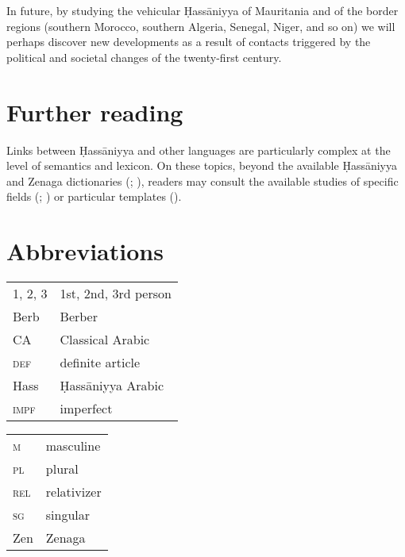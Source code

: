 \documentclass[output=paper]{langsci/langscibook}
\begin{document}
In future, by studying the vehicular Ḥassāniyya of Mauritania and of the border regions (southern Morocco, southern Algeria, Senegal, Niger, and so on) we will perhaps discover new developments as a result of contacts triggered by the political and societal changes of the twenty-first century. 

\section*{Further reading}

Links between Ḥassāniyya and other languages are particularly complex at the level of semantics and lexicon. On these topics, beyond the available Ḥassāniyya and Zenaga dictionaries (\citealt{Heath2004}; \citealt{Taine-Cheikh1988dictionary,Taine-Cheikh2008dictionary}), readers may consult the available studies of specific fields (\citealt{Monteil1952}; \citealt{Taine-Cheikh2013}) or particular templates (\citealt{Taine-Cheikh2018quadri}).

\section*{Abbreviations}
\begin{tabularx}{.5\textwidth}{@{}lQ@{}}
\textsc{1, 2, 3} & 1st, 2nd, 3rd person \\
Berb            & Berber \\
CA           & Classical Arabic \\
\textsc{def}     & definite article \\
Hass           & Ḥassāniyya Arabic \\
\textsc{impf}   & imperfect \\
\end{tabularx}%
\begin{tabularx}{.5\textwidth}{@{}lQ@{}}
\textsc{m}   & masculine\\
\textsc{pl}  & plural\\
\textsc{rel}     & relativizer\\
\textsc{sg}  & singular \\
Zen           & Zenaga \\
\end{tabularx}%
 

\sloppy
\printbibliography[heading=subbibliography,notkeyword=this]
\end{document}
